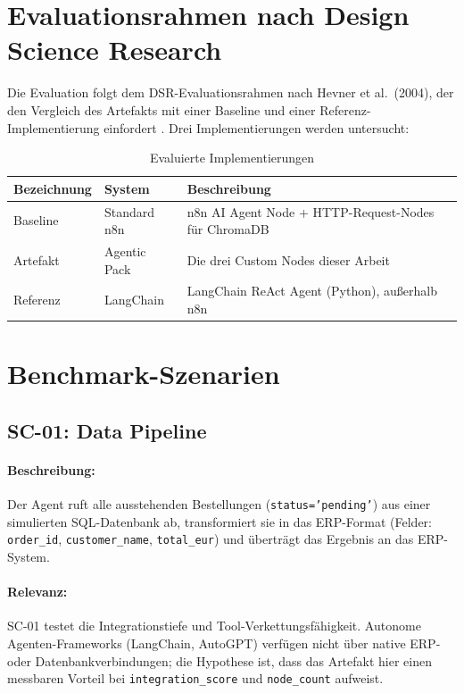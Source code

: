 \documentclass[12pt,a4paper,oneside]{report}
\begin{document}
\section{Evaluationsrahmen nach Design Science Research}

Die Evaluation folgt dem DSR-Evaluationsrahmen nach Hevner et al.\ (2004), der den
Vergleich des Artefakts mit einer Baseline und einer Referenz-Implementierung einfordert
\cite{hevner2004design}. Drei Implementierungen werden untersucht:

\begin{table}[H]
  \centering
  \caption{Evaluierte Implementierungen}
  \label{tab:eval-implementations}
  \begin{tabularx}{\textwidth}{llX}
    \toprule
    \textbf{Bezeichnung} & \textbf{System} & \textbf{Beschreibung} \\
    \midrule
    Baseline  & Standard n8n  & n8n AI Agent Node + HTTP-Request-Nodes für ChromaDB \\
    Artefakt  & Agentic Pack  & Die drei Custom Nodes dieser Arbeit \\
    Referenz  & LangChain     & LangChain ReAct Agent (Python), außerhalb n8n \\
    \bottomrule
  \end{tabularx}
\end{table}

\section{Benchmark-Szenarien}

\subsection{SC-01: Data Pipeline}

\paragraph{Beschreibung:}
Der Agent ruft alle ausstehenden Bestellungen (\texttt{status='pending'}) aus einer
simulierten SQL-Datenbank ab, transformiert sie in das ERP-Format (Felder:
\texttt{order\_id}, \texttt{customer\_name}, \texttt{total\_eur}) und überträgt das
Ergebnis an das ERP-System.

\paragraph{Relevanz:}
SC-01 testet die Integrationstiefe und Tool-Verkettungsfähigkeit. Autonome
Agenten-Frameworks (LangChain, AutoGPT) verfügen nicht über native ERP- oder
Datenbankverbindungen; die Hypothese ist, dass das Artefakt hier einen messbaren
Vorteil bei \texttt{integration\_score} und \texttt{node\_count} aufweist.
\end{document}
